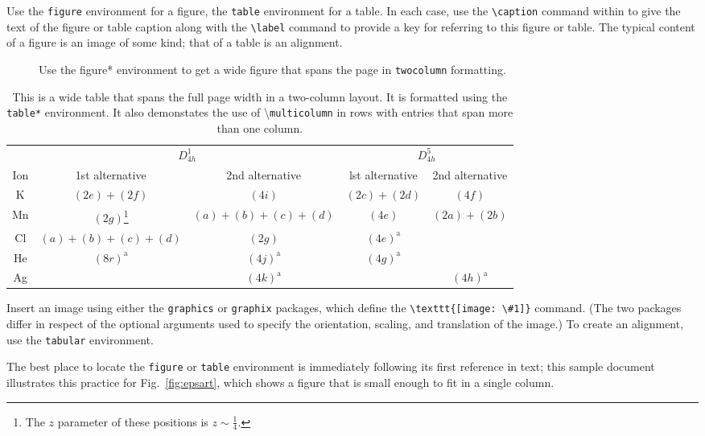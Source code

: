 \documentclass[%
 reprint,
 amsmath,amssymb,
 aps,
]{revtex4-2}
\begin{document}
Use the \texttt{figure} environment for a figure, the \texttt{table} environment for a table.
In each case, use the \verb+\caption+ command within to give the text of the
figure or table caption along with the \verb+\label+ command to provide
a key for referring to this figure or table.
The typical content of a figure is an image of some kind; 
that of a table is an alignment.%
\begin{figure}
\caption{\label{fig:wide}Use the figure* environment to get a wide
figure that spans the page in \texttt{twocolumn} formatting.}
\end{figure}
\begin{table}
\caption{\label{tab:table3}This is a wide table that spans the full page
width in a two-column layout. It is formatted using the
\texttt{table*} environment. It also demonstates the use of
\textbackslash\texttt{multicolumn} in rows with entries that span
more than one column.}
\begin{ruledtabular}
\begin{tabular}{ccccc}
 &\multicolumn{2}{c}{$D_{4h}^1$}&\multicolumn{2}{c}{$D_{4h}^5$}\\
 Ion&1st alternative&2nd alternative&lst alternative
&2nd alternative\\ \hline
 K&$(2e)+(2f)$&$(4i)$ &$(2c)+(2d)$&$(4f)$ \\
 Mn&$(2g)$\footnote{The $z$ parameter of these positions is $z\sim\frac{1}{4}$.}
 &$(a)+(b)+(c)+(d)$&$(4e)$&$(2a)+(2b)$\\
 Cl&$(a)+(b)+(c)+(d)$&$(2g)$\footnotemark[1]
 &$(4e)^{\text{a}}$\\
 He&$(8r)^{\text{a}}$&$(4j)^{\text{a}}$&$(4g)^{\text{a}}$\\
 Ag& &$(4k)^{\text{a}}$& &$(4h)^{\text{a}}$\\
\end{tabular}
\end{ruledtabular}
\end{table}

Insert an image using either the \texttt{graphics} or
\texttt{graphix} packages, which define the \verb+\texttt{[image: \#1]}+ command.
(The two packages differ in respect of the optional arguments 
used to specify the orientation, scaling, and translation of the image.) 
To create an alignment, use the \texttt{tabular} environment. 

The best place to locate the \texttt{figure} or \texttt{table} environment
is immediately following its first reference in text; this sample document
illustrates this practice for Fig.~\ref{fig:epsart}, which
shows a figure that is small enough to fit in a single column. 
\end{document}
